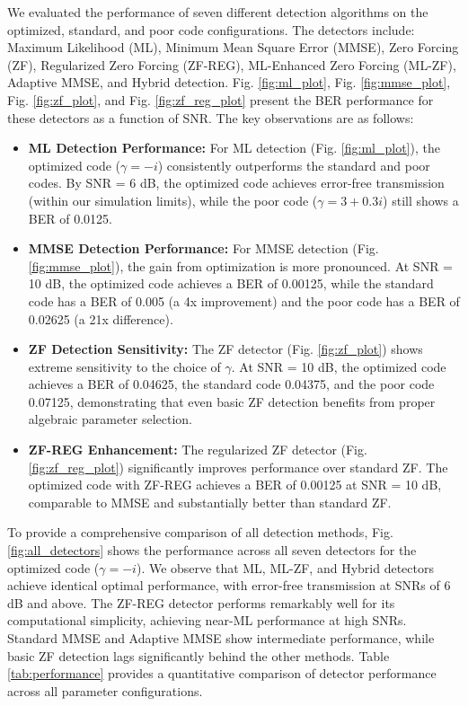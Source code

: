 We evaluated the performance of seven different detection algorithms on the optimized, standard, and poor code configurations. The detectors include: Maximum Likelihood (ML), Minimum Mean Square Error (MMSE), Zero Forcing (ZF), Regularized Zero Forcing (ZF-REG), ML-Enhanced Zero Forcing (ML-ZF), Adaptive MMSE, and Hybrid detection. Fig. \ref{fig:ml_plot}, Fig. \ref{fig:mmse_plot}, Fig. \ref{fig:zf_plot}, and Fig. \ref{fig:zf_reg_plot} present the BER performance for these detectors as a function of SNR. The key observations are as follows:
\begin{itemize}
    \item \textbf{ML Detection Performance:} For ML detection (Fig. \ref{fig:ml_plot}), the optimized code (\(\gamma = -i\)) consistently outperforms the standard and poor codes. By SNR = 6 dB, the optimized code achieves error-free transmission (within our simulation limits), while the poor code (\(\gamma = 3 + 0.3i\)) still shows a BER of 0.0125.
    
    \item \textbf{MMSE Detection Performance:} For MMSE detection (Fig. \ref{fig:mmse_plot}), the gain from optimization is more pronounced. At SNR = 10 dB, the optimized code achieves a BER of 0.00125, while the standard code has a BER of 0.005 (a 4x improvement) and the poor code has a BER of 0.02625 (a 21x difference).
    
    \item \textbf{ZF Detection Sensitivity:} The ZF detector (Fig. \ref{fig:zf_plot}) shows extreme sensitivity to the choice of \(\gamma\). At SNR = 10 dB, the optimized code achieves a BER of 0.04625, the standard code 0.04375, and the poor code 0.07125, demonstrating that even basic ZF detection benefits from proper algebraic parameter selection.
    
    \item \textbf{ZF-REG Enhancement:} The regularized ZF detector (Fig. \ref{fig:zf_reg_plot}) significantly improves performance over standard ZF. The optimized code with ZF-REG achieves a BER of 0.00125 at SNR = 10 dB, comparable to MMSE and substantially better than standard ZF.
\end{itemize}

To provide a comprehensive comparison of all detection methods, Fig. \ref{fig:all_detectors} shows the performance across all seven detectors for the optimized code (\(\gamma = -i\)). We observe that ML, ML-ZF, and Hybrid detectors achieve identical optimal performance, with error-free transmission at SNRs of 6 dB and above. The ZF-REG detector performs remarkably well for its computational simplicity, achieving near-ML performance at high SNRs. Standard MMSE and Adaptive MMSE show intermediate performance, while basic ZF detection lags significantly behind the other methods. Table \ref{tab:performance} provides a quantitative comparison of detector performance across all parameter configurations.

